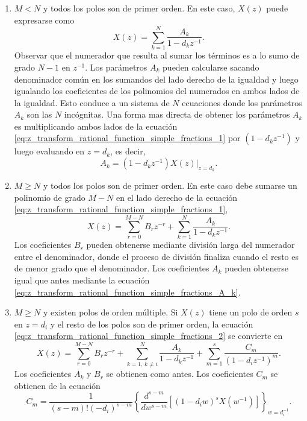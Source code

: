 \documentclass[a4paper]{report}
\begin{document}
\begin{enumerate}
 \item \(M<N\) y todos los polos son de primer orden. En este caso, \(X(z)\) puede expresarse como
 \begin{equation}\label{eq:z_transform_rational_function_simple_fractions_1}
  X(z)=\sum_{k=1}^N\frac{A_k}{1-d_kz^{-1}}.  
 \end{equation}
 Observar que el numerador que resulta al sumar los términos es a lo sumo de grado \(N-1\) en \(z^{-1}\).
 Los parámetros \(A_k\) pueden calcularse sacando denominador común en los sumandos del lado derecho de la igualdad y luego igualando los coeficientes de los polinomios del numerados en ambos lados de la igualdad. Esto conduce a un sistema de \(N\) ecuaciones donde los parámetros \(A_k\) son las \(N\) incógnitas. Una forma mas directa de obtener los parámetros \(A_k\) es multiplicando ambos lados de la ecuación \ref{eq:z_transform_rational_function_simple_fractions_1} por \((1-d_kz^{-1})\) y luego evaluando en \(z=d_k\), es decir,
 \begin{equation}\label{eq:z_transform_rational_function_simple_fractions_A_k}
  A_k=(1-d_kz^{-1})X(z)\big|_{z=d_k}.  
 \end{equation}
 \item \(M\geq N\) y todos los polos son de primer orden. En este caso debe sumarse un polinomio de grado \(M-N\) en el lado derecho de la ecuación \ref{eq:z_transform_rational_function_simple_fractions_1},
 \begin{equation}\label{eq:z_transform_rational_function_simple_fractions_2}
  X(z)=\sum_{r=0}^{M-N}B_rz^{-r}+\sum_{k=1}^N\frac{A_k}{1-d_kz^{-1}}.  
 \end{equation}
 Los coeficientes \(B_r\) pueden obtenerse mediante división larga del numerador entre el denominador, donde el proceso de división finaliza cuando el resto es de menor grado que el denominador. Los coeficientes \(A_k\) pueden obtenerse igual que antes mediante la ecuación \ref{eq:z_transform_rational_function_simple_fractions_A_k}.
 \item \(M\geq N\) y existen polos de orden múltiple. Si \(X(z)\) tiene un polo de orden \(s\) en \(z=d_i\) y el resto de los polos son de primer orden, la ecuación \ref{eq:z_transform_rational_function_simple_fractions_2} se convierte en
 \begin{equation}\label{eq:z_transform_rational_function_simple_fractions_3}
  X(z)=\sum_{r=0}^{M-N}B_rz^{-r}+\sum_{k=1,\,k\neq i}^N\frac{A_k}{1-d_kz^{-1}}+\sum_{m=1}^s\frac{C_m}{(1-d_iz^{-1})^m}.  
 \end{equation}
 Los coeficientes \(A_k\) y \(B_r\) se obtienen como antes. Los coeficientes \(C_m\) se obtienen de la ecuación
 \[
  C_m=\frac{1}{(s-m)!(-d_i)^{s-m}}\left\{\frac{d^{s-m}}{dw^{s-m}}\left[(1-d_iw)^sX(w^{-1})\right]\right\}_{w=d_i^{-1}}.
 \]
\end{enumerate}
\end{document}
